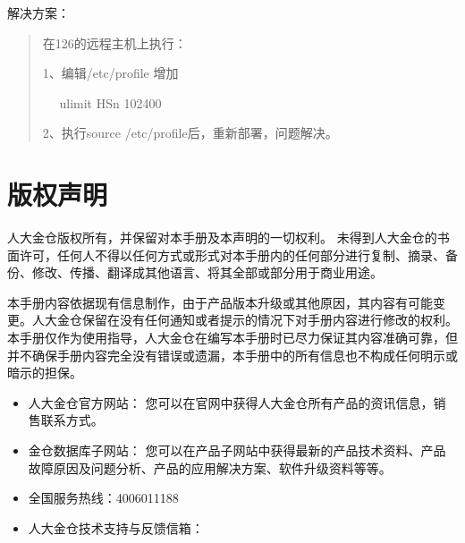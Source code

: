 \documentclass[letterpaper,10pt,english]{sphinxmanual}
\begin{document}
解决方案：
\begin{quote}

在126的远程主机上执行：

1、编辑/etc/profile 增加

   ulimit \sphinxhyphen{}HSn 102400

2、执行source /etc/profile后，重新部署，问题解决。
\end{quote}

\appendix
{}\label{\detokenize{legalnotice::doc}}

\chapter{版权声明}
\label{\detokenize{legalnotice:id1}}
人大金仓版权所有，并保留对本手册及本声明的一切权利。
未得到人大金仓的书面许可，任何人不得以任何方式或形式对本手册内的任何部分进行复制、摘录、备份、修改、传播、翻译成其他语言、将其全部或部分用于商业用途。


本手册内容依据现有信息制作，由于产品版本升级或其他原因，其内容有可能变更。人大金仓保留在没有任何通知或者提示的情况下对手册内容进行修改的权利。
本手册仅作为使用指导，人大金仓在编写本手册时已尽力保证其内容准确可靠，但并不确保手册内容完全没有错误或遗漏，本手册中的所有信息也不构成任何明示或暗示的担保。

\begin{itemize}
\item {} 
人大金仓官方网站：
您可以在官网中获得人大金仓所有产品的资讯信息，销售联系方式。

\item {} 
金仓数据库子网站：
您可以在产品子网站中获得最新的产品技术资料、产品故障原因及问题分析、产品的应用解决方案、软件升级资料等等。

\item {} 
全国服务热线：400\sphinxhyphen{}601\sphinxhyphen{}1188

\item {} 
人大金仓技术支持与反馈信箱：

\end{itemize}



\renewcommand{\indexname}{Index}
\printindex
\end{document}
